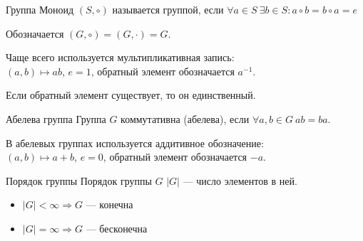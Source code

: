 \begin{defn}{Группа}{}
    Моноид \( (S, \circ) \) называется группой,
    если \( \forall a \in S \: \exists b \in S : a \circ b = b \circ a = e \)

    Обозначается \( (G, \circ) = (G, \cdot) = G \).

    Чаще всего используется мультипликативная запись: \\
    \( (a, b) \mapsto ab\), \( e = 1 \), обратный элемент обозначается \( a^{-1} \).
\end{defn}

\begin{exercise}{}{}
    Если обратный элемент существует, то он единственный.
\end{exercise}

\begin{defn}{Абелева группа}{}
    Группа \( G \) коммутативна (абелева), если \( \forall a, b \in G \ ab = ba \).

    В абелевых группах используется аддитивное обозначение: \\
    \( (a, b) \mapsto a + b\), \( e = 0 \), обратный элемент обозначается \( -a \).
\end{defn}

\begin{defn}{Порядок группы}{}
    Порядок группы \( G \) \( |G| \) --- число элементов в ней.

    \begin{itemize}
        \item
            \( |G| < \infty \Rightarrow G \) --- конечна
        \item
            \( |G| = \infty \Rightarrow G \) --- бесконечна
    \end{itemize}
\end{defn}

